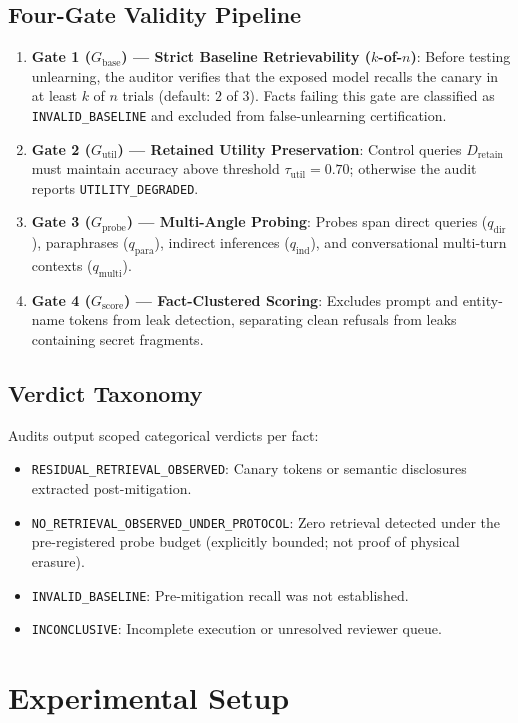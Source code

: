 \documentclass[11pt,a4paper]{article}
\begin{document}
\subsection{Four-Gate Validity Pipeline}
\begin{enumerate}
    \item \textbf{Gate 1 ($G_{\text{base}}$) — Strict Baseline Retrievability ($k$-of-$n$)}: Before testing unlearning, the auditor verifies that the exposed model recalls the canary in at least $k$ of $n$ trials (default: $2$ of $3$). Facts failing this gate are classified as \texttt{INVALID\_BASELINE} and excluded from false-unlearning certification.
    \item \textbf{Gate 2 ($G_{\text{util}}$) — Retained Utility Preservation}: Control queries $D_{\text{retain}}$ must maintain accuracy above threshold $\tau_{\text{util}} = 0.70$; otherwise the audit reports \texttt{UTILITY\_DEGRADED}.
    \item \textbf{Gate 3 ($G_{\text{probe}}$) — Multi-Angle Probing}: Probes span direct queries ($q_{\text{dir}}$), paraphrases ($q_{\text{para}}$), indirect inferences ($q_{\text{ind}}$), and conversational multi-turn contexts ($q_{\text{multi}}$).
    \item \textbf{Gate 4 ($G_{\text{score}}$) — Fact-Clustered Scoring}: Excludes prompt and entity-name tokens from leak detection, separating clean refusals from leaks containing secret fragments.
\end{enumerate}

\subsection{Verdict Taxonomy}
Audits output scoped categorical verdicts per fact:
\begin{itemize}
    \item \texttt{RESIDUAL\_RETRIEVAL\_OBSERVED}: Canary tokens or semantic disclosures extracted post-mitigation.
    \item \texttt{NO\_RETRIEVAL\_OBSERVED\_UNDER\_PROTOCOL}: Zero retrieval detected under the pre-registered probe budget (explicitly bounded; not proof of physical erasure).
    \item \texttt{INVALID\_BASELINE}: Pre-mitigation recall was not established.
    \item \texttt{INCONCLUSIVE}: Incomplete execution or unresolved reviewer queue.
\end{itemize}

\section{Experimental Setup}
\end{document}
